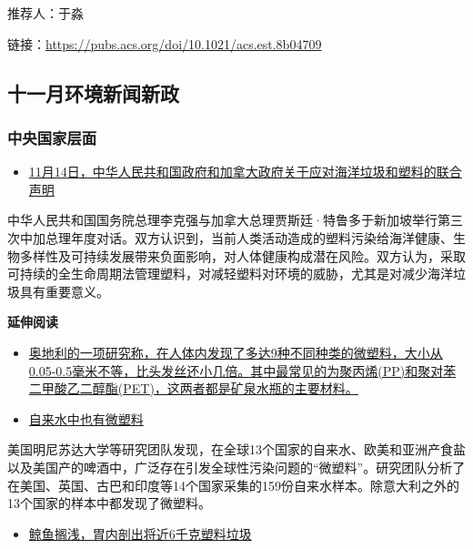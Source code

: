 \documentclass[
]{book}
\providecommand{\tightlist}{%
  \setlength{\itemsep}{0pt}\setlength{\parskip}{0pt}}
\begin{document}
推荐人：于淼

链接：\url{https://pubs.acs.org/doi/10.1021/acs.est.8b04709}

\hypertarget{ux5341ux4e00ux6708ux73afux5883ux65b0ux95fbux65b0ux653f}{%
\subsection*{十一月环境新闻新政}\label{ux5341ux4e00ux6708ux73afux5883ux65b0ux95fbux65b0ux653f}}

\hypertarget{ux4e2dux592eux56fdux5bb6ux5c42ux9762}{%
\subsubsection*{中央国家层面}\label{ux4e2dux592eux56fdux5bb6ux5c42ux9762}}

\begin{itemize}
\tightlist
\item
  \href{https://www.mfa.gov.cn/web/ziliao_674904/1179_674909/t1613067.shtml}{11月14日，中华人民共和国政府和加拿大政府关于应对海洋垃圾和塑料的联合声明}
\end{itemize}

中华人民共和国国务院总理李克强与加拿大总理贾斯廷·特鲁多于新加坡举行第三次中加总理年度对话。双方认识到，当前人类活动造成的塑料污染给海洋健康、生物多样性及可持续发展带来负面影响，对人体健康构成潜在风险。双方认为，采取可持续的全生命周期法管理塑料，对减轻塑料对环境的威胁，尤其是对减少海洋垃圾具有重要意义。

\textbf{延伸阅读}

\begin{itemize}
\item
  \href{http://tech.ifeng.com/a/20181028/45202181_0.shtml}{奥地利的一项研究称，在人体内发现了多达9种不同种类的微塑料，大小从0.05-0.5毫米不等，比头发丝还小几倍。其中最常见的为聚丙烯(PP)和聚对苯二甲酸乙二醇酯(PET)，这两者都是矿泉水瓶的主要材料。}
\item
  \href{http://news.ifeng.com/a/20180906/60032654_0.shtml}{自来水中也有微塑料}
\end{itemize}

美国明尼苏达大学等研究团队发现，在全球13个国家的自来水、欧美和亚洲产食盐以及美国产的啤酒中，广泛存在引发全球性污染问题的``微塑料''。研究团队分析了在美国、英国、古巴和印度等14个国家采集的159份自来水样本。除意大利之外的13个国家的样本中都发现了微塑料。

\begin{itemize}
\tightlist
\item
  \href{https://baijiahao.baidu.com/s?id=1617711608828470969\&wfr=spider\&for=pc}{鲸鱼搁浅，胃内剖出将近6千克塑料垃圾}
\end{itemize}
\end{document}
